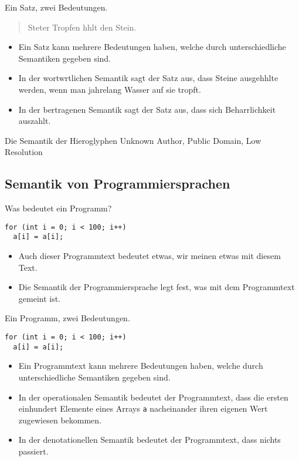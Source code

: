 \begin{frame}{Ein Satz, zwei Bedeutungen.}
  \begin{quotation}
    Steter Tropfen hhlt den Stein.
  \end{quotation}

  \bigskip
  \begin{itemize}
  \item Ein Satz kann \alert{mehrere Bedeutungen haben}, welche durch
    \alert{unterschiedliche Semantiken} gegeben sind.
  \item In der \alert{wortwrtlichen Semantik} sagt der Satz aus, dass
    Steine ausgehhlte werden, wenn man jahrelang Wasser auf
    sie tropft.
  \item In der \alert{bertragenen Semantik} sagt der Satz aus, dass
    sich Beharrlichkeit auszahlt.
  \end{itemize}
\end{frame}

\begin{frame}{Die Semantik der Hieroglyphen}
  {Unknown Author, Public Domain, Low Resolution}
\end{frame}


\subsection{Semantik von Programmiersprachen}

\begin{frame}[fragile]{Was bedeutet ein Programm?}
\begin{verbatim}
for (int i = 0; i < 100; i++)
  a[i] = a[i];
\end{verbatim}
  \begin{itemize}
  \item Auch dieser Programmtext bedeutet etwas, wir meinen etwas
    mit diesem Text.
  \item Die \alert{Semantik der Programmiersprache} legt fest,
    was mit dem Programmtext gemeint ist.
  \end{itemize}
\end{frame}

\begin{frame}[fragile]{Ein Programm, zwei Bedeutungen.}
\begin{verbatim}
for (int i = 0; i < 100; i++)
  a[i] = a[i];
\end{verbatim}
  \begin{itemize}
  \item Ein Programmtext kann \alert{mehrere Bedeutungen haben},
    welche durch \alert{unterschiedliche Semantiken} gegeben sind.
  \item In der \alert{operationalen Semantik} bedeutet der
    Programmtext, dass die ersten einhundert Elemente eines Arrays
    \verb!a! nacheinander ihren eigenen Wert zugewiesen bekommen.
  \item In der \alert{denotationellen Semantik} bedeutet der
    Programmtext, dass nichts passiert.
  \end{itemize}
\end{frame}


